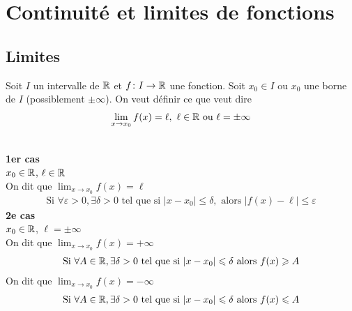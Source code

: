 \chapter{Continuité et limites de fonctions}
\section{Limites}
Soit $I$ un intervalle de $\mathbb{R}$ et $f \colon I \to \mathbb{R}$ une fonction.
Soit $x_0 \in I$ ou $x_0$ une borne de $I$ (possiblement $\pm \infty$).
On veut définir ce que veut dire 
\begin{align*}
    \lim_{x \to x_0} f(x) = \ell,\ \ell \in \mathbb{R} \text{ ou } \ell = \pm \infty
\end{align*}

\begin{graybox}
\begin{definition}~ 
\\
\textbf{1er cas} \\
$x_0 \in \mathbb{R}$, $\ell \in \mathbb{R}$ \\
On dit que $\displaystyle \lim_{x \to x_0} f(x) = \ell$
\begin{align*}
    \text{Si } \forall \varepsilon > 0, \exists \delta > 0 \text{ tel que si } |x -x_0| \leq \delta, \text{ alors } |f(x) - \ell| \leq \varepsilon
\end{align*}
\textbf{2e cas} \\
$x_0 \in \mathbb{R}$, $\ell = \pm \infty$ \\
On dit que $\displaystyle \lim_{x \to x_0} f(x) = +\infty$ 
\begin{align*}
    \text{Si } \forall A \in \mathbb{R}, \exists \delta > 0 \text{ tel que si } |x - x_0| \leqslant \delta \text{ alors } f(x) \geqslant A
\end{align*}
On dit que $\displaystyle \lim_{x \to x_0} f(x) = -\infty$ 
\begin{align*}
    \text{Si } \forall A \in \mathbb{R}, \exists \delta > 0 \text{ tel que si } |x - x_0| \leqslant \delta \text{ alors } f(x) \leqslant A
\end{align*}
\end{definition}
\end{graybox}

